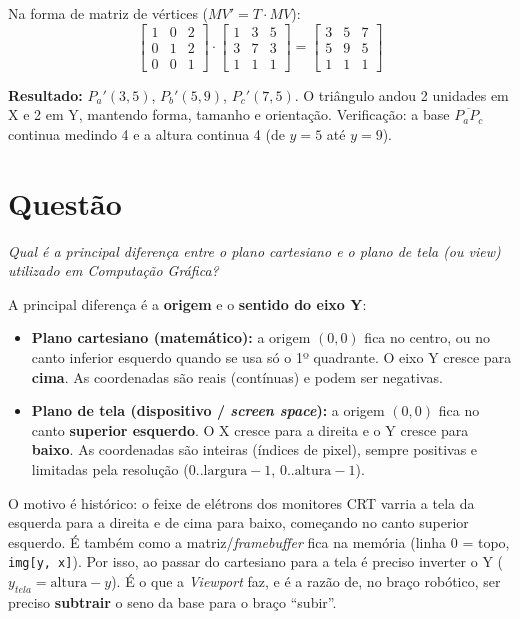 \documentclass{article}
\newcounter{questao}
\newcommand{\questao}[1]{%
      \stepcounter{questao}%
      \section*{Questão \arabic{questao}}%
      \textit{#1}\par\medskip}
\begin{document}
Na forma de matriz de vértices ($MV' = T \cdot MV$):
\[
      \begin{bmatrix}
            1 & 0 & 2 \\
            0 & 1 & 2 \\
            0 & 0 & 1
      \end{bmatrix}
      \cdot
      \begin{bmatrix}
            1 & 3 & 5 \\
            3 & 7 & 3 \\
            1 & 1 & 1
      \end{bmatrix}
      =
      \begin{bmatrix}
            3 & 5 & 7 \\
            5 & 9 & 5 \\
            1 & 1 & 1
      \end{bmatrix}
\]

\textbf{Resultado:} $P_a'(3,5)$, $P_b'(5,9)$, $P_c'(7,5)$. O triângulo andou 2 unidades em X e 2 em Y, mantendo forma, tamanho e orientação. Verificação: a base $\overline{P_a P_c}$ continua medindo 4 e a altura continua 4 (de $y=5$ até $y=9$).

\questao{Qual é a principal diferença entre o plano cartesiano e o plano de tela (ou view) utilizado em Computação Gráfica?}

A principal diferença é a \textbf{origem} e o \textbf{sentido do eixo Y}:

\begin{itemize}
      \item \textbf{Plano cartesiano (matemático):} a origem $(0,0)$ fica no centro, ou no canto inferior esquerdo quando se usa só o 1º quadrante. O eixo Y cresce para \textbf{cima}. As coordenadas são reais (contínuas) e podem ser negativas.
      \item \textbf{Plano de tela (dispositivo / \textit{screen space}):} a origem $(0,0)$ fica no canto \textbf{superior esquerdo}. O X cresce para a direita e o Y cresce para \textbf{baixo}. As coordenadas são inteiras (índices de pixel), sempre positivas e limitadas pela resolução ($0..\text{largura}-1$, $0..\text{altura}-1$).
\end{itemize}

O motivo é histórico: o feixe de elétrons dos monitores CRT varria a tela da esquerda para a direita e de cima para baixo, começando no canto superior esquerdo. É também como a matriz/\textit{framebuffer} fica na memória (linha 0 = topo, \texttt{img[y, x]}). Por isso, ao passar do cartesiano para a tela é preciso inverter o Y ($y_{tela} = \text{altura} - y$). É o que a \textit{Viewport} faz, e é a razão de, no braço robótico, ser preciso \textbf{subtrair} o seno da base para o braço ``subir''.
\end{document}
